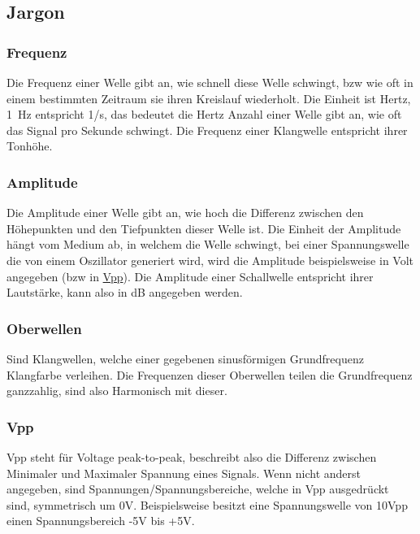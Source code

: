 \subsection{Jargon}
\label{sec:org461286c}
\subsubsection{Frequenz}
\label{sec:org3fe41a6}
Die Frequenz einer Welle gibt an, wie schnell diese Welle schwingt, bzw wie oft in einem bestimmten Zeitraum sie ihren Kreislauf wiederholt. Die Einheit ist Hertz, \SI{1}{\hertz} entspricht 1/s, das bedeutet die Hertz Anzahl einer Welle gibt an, wie oft das Signal pro Sekunde schwingt. Die Frequenz einer Klangwelle entspricht ihrer Tonhöhe.

\subsubsection{Amplitude}
\label{sec:orgadd0ccc}
Die Amplitude einer Welle gibt an, wie hoch die Differenz zwischen den Höhepunkten und den Tiefpunkten dieser Welle ist. Die Einheit der Amplitude hängt vom Medium ab, in welchem die Welle schwingt, bei einer Spannungswelle die von einem Oszillator generiert wird, wird die Amplitude beispielsweise in Volt angegeben (bzw in \hyperref[sec:org549d6e7]{Vpp}). Die Amplitude einer Schallwelle entspricht ihrer Lautstärke, kann also in dB angegeben werden.

\subsubsection{Oberwellen}
\label{sec:org50de104}
Sind Klangwellen, welche einer gegebenen sinusförmigen Grundfrequenz Klangfarbe verleihen. Die Frequenzen dieser Oberwellen teilen die Grundfrequenz ganzzahlig, sind also Harmonisch mit dieser.

\subsubsection{Vpp}
\label{sec:org549d6e7}
Vpp steht für Voltage peak-to-peak, beschreibt also die Differenz zwischen Minimaler und Maximaler Spannung eines Signals. Wenn nicht anderst angegeben, sind Spannungen/Spannungsbereiche, welche in Vpp ausgedrückt sind, symmetrisch um 0V. Beispielsweise besitzt eine Spannungswelle von 10Vpp einen Spannungsbereich -5V bis +5V.

